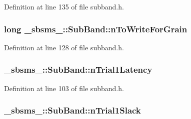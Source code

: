 Definition at line 135 of file subband.\+h.

\subsubsection[{\texorpdfstring{n\+To\+Write\+For\+Grain}{nToWriteForGrain}}]{\setlength{\rightskip}{0pt plus 5cm}long \+\_\+sbsms\+\_\+\+::\+Sub\+Band\+::n\+To\+Write\+For\+Grain\hspace{0.3cm}{\ttfamily [protected]}}\hypertarget{class__sbsms___1_1_sub_band_a173e3f56ec7a5163b2967c1c6694b4a4}{}\label{class__sbsms___1_1_sub_band_a173e3f56ec7a5163b2967c1c6694b4a4}


Definition at line 128 of file subband.\+h.

\subsubsection[{\texorpdfstring{n\+Trial1\+Latency}{nTrial1Latency}}]{ \+\_\+sbsms\+\_\+\+::\+Sub\+Band\+::n\+Trial1\+Latency\hspace{0.3cm}{\ttfamily [protected]}}\hypertarget{class__sbsms___1_1_sub_band_aeceb990dbd2ecce998eeaaaf5f7a3b93}{}\label{class__sbsms___1_1_sub_band_aeceb990dbd2ecce998eeaaaf5f7a3b93}


Definition at line 103 of file subband.\+h.

\subsubsection[{\texorpdfstring{n\+Trial1\+Slack}{nTrial1Slack}}]{ \+\_\+sbsms\+\_\+\+::\+Sub\+Band\+::n\+Trial1\+Slack\hspace{0.3cm}{\ttfamily [protected]}}\hypertarget{class__sbsms___1_1_sub_band_afff276ae74384fc623cb669463d0020f}{}\label{class__sbsms___1_1_sub_band_afff276ae74384fc623cb669463d0020f}


